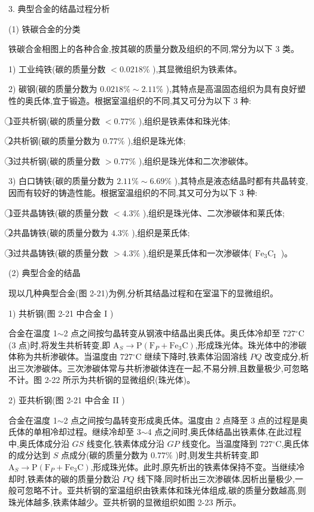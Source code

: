 \documentclass[UTF8]{ctexbook}
\newcommand{\◎}{\ensuremath{\bigcirc}}
\begin{document}
3. 典型合金的结晶过程分析

(1) 铁碳合金的分类

铁碳合金相图上的各种合金,按其碳的质量分数及组织的不同,常分为以下 3 类。

1) 工业纯铁(碳的质量分数 $<0.0218 \%$ ),其显微组织为铁素体。

2) 碳钢(碳的质量分数为 $0.0218 \% \sim 2.11 \%$ ),其特点是高温固态组织为具有良好塑性的奥氏体,宜于锻造。根据室温组织的不同,其又可分为以下 3 种:

\textcircled{1}亚共析钢(碳的质量分数 $<0.77 \%$ ),组织是铁素体和珠光体;

\textcircled{2}共析钢(碳的质量分数为 $0.77 \%$ ),组织是珠光体;

\textcircled{3}过共析钢(碳的质量分数 $>0.77 \%$ ),组织是珠光体和二次渗碳体。

3) 白口铸铁(碳的质量分数为 $2.11 \% \sim 6.69 \%$ ),其特点是液态结晶时都有共晶转变,因而有较好的铸造性能。根据室温组织的不同,其又可分为以下 3 种:

\textcircled{1}亚共晶铸铁(碳的质量分数 $<4.3 \%$ ),组织是珠光体、二次渗碳体和莱氏体;

\textcircled{2}共晶铸铁(碳的质量分数为 $4.3 \%$ ),组织是莱氏体;

\textcircled{3}过共晶铸铁(碳的质量分数 $>4.3 \%$ ),组织是莱氏体和一次渗碳体( $\mathrm{Fe}_{3} \mathrm{C}_{\text {I }}$ )。

(2) 典型合金的结晶

现以几种典型合金(图 2-21)为例,分析其结晶过程和在室温下的显微组织。

1) 共析钢(图 2-21 中合金 I )

合金在温度 1$\sim$2 点之间按匀晶转变从钢液中结晶出奥氏体。奥氏体冷却至 $727{ }^{\circ} \mathrm{C}$ (3 点)时,将发生共析转变,即 $\mathrm{A}_{S} \longrightarrow \mathrm{P}\left(\mathrm{F}_{P}+\mathrm{Fe}_{3} \mathrm{C}\right)$,形成珠光体。珠光体中的渗碳体称为共析渗碳体。当温度由 $727{ }^{\circ} \mathrm{C}$ 继续下降时,铁素体沿固溶线 $P Q$ 改变成分,析出三次渗碳体。三次渗碳体常与共析渗碳体连在一起,不易分辨,且数量极少,可忽略不计。图 2-22 所示为共析钢的显微组织(珠光体)。

2) 亚共析钢(图 2-21 中合金 II )

合金在温度 1$\sim$2 点之间按匀晶转变形成奥氏体。温度由 2 点降至 3 点的过程是奥氏体的单相冷却过程。继续冷却至 3$\sim$4 点之间时,奥氏体结晶出铁素体,在此过程中,奥氏体成分沿 $G S$ 线变化,铁素体成分沿 $G P$ 线变化。当温度降到 $727{ }^{\circ} \mathrm{C}$,奥氏体的成分达到 $S$ 点成分(碳的质量分数为 $0.77 \%$ )时,则发生共析转变,即 $\mathrm{A}_{S} \longrightarrow \mathrm{P}\left(\mathrm{F}_{P}+\mathrm{Fe}_{3} \mathrm{C}\right)$,形成珠光体。此时,原先析出的铁素体保持不变。当继续冷却时,铁素体的碳的质量分数沿 $P Q$ 线下降,同时析出三次渗碳体,因析出量极少,一般可忽略不计。亚共析钢的室温组织由铁素体和珠光体组成,碳的质量分数越高,则珠光体越多,铁素体越少。亚共析钢的显微组织如图 2-23 所示。
\end{document}
